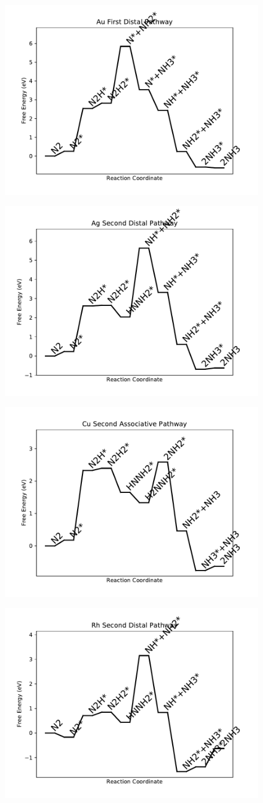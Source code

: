 \documentclass[journal=jacsat,manuscript=article]{achemso}
\begin{document}
\begin{figure}
\includegraphics[width=0.5\linewidth]{data/plots/Au_distal_1.pdf}
\label{fig:Au_distal_1}
\end{figure}

\newpage
\begin{figure}
\includegraphics[width=0.5\linewidth]{data/plots/Ag_distal_2.pdf}
\label{fig:Ag_distal_2}
\end{figure}

\begin{figure}
\includegraphics[width=0.5\linewidth]{data/plots/Cu_associative_2.pdf}
\label{fig:Cu_associative_2}
\end{figure}

\newpage
\begin{figure}
\includegraphics[width=0.5\linewidth]{data/plots/Rh_distal_2.pdf}
\label{fig:Rh_distal_2}
\end{figure}
\end{document}
